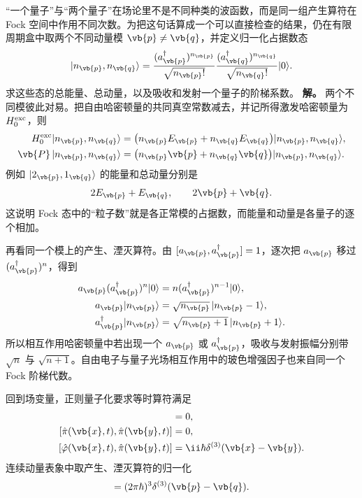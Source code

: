 \begin{exbox}
“一个量子”与“两个量子”在场论里不是不同种类的波函数，而是同一组产生算符在 Fock 空间中作用不同次数。为把这句话算成一个可以直接检查的结果，仍在有限周期盒中取两个不同动量模 $\vb{p}\neq\vb{q}$，并定义归一化占据数态
\begin{equation*}
 |n_{\vb{p}},n_{\vb{q}}\rangle
 =\frac{(a_{\vb{p}}^\dagger)^{n_{\vb{p}}}}{\sqrt{n_{\vb{p}}!}}
  \frac{(a_{\vb{q}}^\dagger)^{n_{\vb{q}}}}{\sqrt{n_{\vb{q}}!}}|0\rangle .
\end{equation*}
求这些态的总能量、总动量，以及吸收和发射一个量子的阶梯系数。
\textbf{解。} 两个不同模彼此对易。把自由哈密顿量的共同真空常数减去，并记所得激发哈密顿量为 $H_0^{\rm exc}$，则
\begin{align*}
 H_0^{\rm exc}|n_{\vb{p}},n_{\vb{q}}\rangle
 &=\bigl(n_{\vb{p}}E_{\vb{p}}+n_{\vb{q}}E_{\vb{q}}\bigr)
 |n_{\vb{p}},n_{\vb{q}}\rangle,\\
 \vb{P}\,|n_{\vb{p}},n_{\vb{q}}\rangle
 &=\bigl(n_{\vb{p}}\vb{p}+n_{\vb{q}}\vb{q}\bigr)
 |n_{\vb{p}},n_{\vb{q}}\rangle.
\end{align*}
例如 $|2_{\vb{p}},1_{\vb{q}}\rangle$ 的能量和总动量分别是
\begin{equation*}
 2E_{\vb{p}}+E_{\vb{q}},
 \qquad
 2\vb{p}+\vb{q}.
\end{equation*}
这说明 Fock 态中的“粒子数”就是各正常模的占据数，而能量和动量是各量子的逐个相加。

再看同一个模上的产生、湮灭算符。由 $[a_{\vb{p}},a_{\vb{p}}^\dagger]=1$，逐次把 $a_{\vb{p}}$ 移过 $(a_{\vb{p}}^\dagger)^n$，得到
\begin{align*}
 a_{\vb{p}}(a_{\vb{p}}^\dagger)^n|0\rangle
 &=n(a_{\vb{p}}^\dagger)^{n-1}|0\rangle,\\
 a_{\vb{p}}|n_{\vb{p}}\rangle
 &=\sqrt{n_{\vb{p}}}\,|n_{\vb{p}}-1\rangle,\\
 a_{\vb{p}}^\dagger|n_{\vb{p}}\rangle
 &=\sqrt{n_{\vb{p}}+1}\,|n_{\vb{p}}+1\rangle.
\end{align*}
所以相互作用哈密顿量中若出现一个 $a_{\vb{p}}$ 或 $a_{\vb{p}}^\dagger$，吸收与发射振幅分别带 $\sqrt n$ 与 $\sqrt{n+1}$。自由电子与量子光场相互作用中的玻色增强因子也来自同一个 Fock 阶梯代数。
\end{exbox}

回到场变量，正则量子化要求等时算符满足
\begin{align}
 [\hat\varphi(\vb{x},t),\hat\varphi(\vb{y},t)]&=0,\\
 [\hat\pi(\vb{x},t),\hat\pi(\vb{y},t)]&=0,\\
 [\hat\varphi(\vb{x},t),\hat\pi(\vb{y},t)]
 &=\ii\hbar\delta^{(3)}(\vb{x}-\vb{y}).
 \label{eq:kg-canonical-r2}
\end{align}
连续动量表象中取产生、湮灭算符的归一化
\begin{equation}
 [\hat a(\vb{p}),\hat a^\dagger(\vb{q})]
 =(2\pi\hbar)^3\delta^{(3)}(\vb{p}-\vb{q}).
 \label{eq:scalar-aa-r2}
\end{equation}

